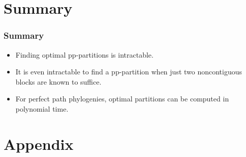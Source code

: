 \documentclass{beamer}
\begin{document}
\section*{Summary}

\begin{frame}
  \frametitle<presentation>{Summary}

  \begin{itemize}
  \item
    Finding optimal pp-partitions is \alert{intractable}. 
  \item
    It is even intractable to find a pp-partition when \alert{just two 
      noncontiguous  blocks are known to suffice}.
  \item
    For perfect \alert{path} phylogenies, optimal partitions can be
    computed \alert{in polynomial time}.
  \end{itemize}
\end{frame}


\appendix

\section*{Appendix}
\end{document}
